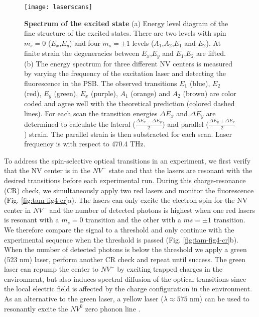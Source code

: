 \begin{figure*}
	\centering
	\texttt{[image: laserscans]}
	\caption{\label{fig:tam-fig4-laserscan} \textbf{Spectrum of the excited state} (a) Energy level diagram of the fine structure of the excited states. There are two levels with spin $m_s = 0$ ($E_x$,$E_y$) and four $m_s = \pm 1$ levels ($A_1$,$A_2$,$E_1$ and $E_2$). At finite strain the degeneracies between $E_x$,$E_y$ and $E_1$,$E_2$ are lifted. (b) The energy spectrum for three different NV centers is measured by varying the frequency of the excitation laser and detecting the fluorescence in the PSB. The observed transitions $E_1$ (blue), $E_2$ (red), $E_y$ (green), $E_x$ (purple), $A_1$ (orange) and $A_2$ (brown) are color coded and agree well with the theoretical prediction (colored dashed lines). For each scan the transition energies $\Delta E_x$ and $\Delta E_y$ are determined to calculate the lateral ($\frac{\Delta E_x-\Delta E_y}{2}$) and parallel ($\frac{\Delta E_y+\Delta E_x}{2}$) strain. The parallel strain is then substracted for each scan. Laser frequency is with respect to 470.4 THz.}
\end{figure*}

To address the spin-selective optical transitions in an experiment, we first verify that the NV center is in the $NV^-$ state and that the lasers are resonant with the desired transitions before each experimental run. During this charge-resonance (CR) check, we simultaneously apply two red lasers and monitor the fluorescence (Fig. \ref{fig:tam-fig4-cr}a). The lasers can only excite the electron spin for the NV center in $NV^-$ and the number of detected photons is highest when one red lasers is resonant with a $m_s = 0$ transition and the other with a $ms=\pm1$ transition. We therefore compare the signal to a threshold and only continue with the experimental sequence when the threshold is passed (Fig. \ref{fig:tam-fig4-cr}b). When the number of detected photons is below the threshold we apply a green (523 nm) laser, perform another CR check and repeat until success. The green laser can repump the center to $NV^-$ by exciting trapped charges in the environment, but also induces spectral diffusion of the optical transitions since the local electric field is affected by the charge configuration in the environment. As an alternative to the green laser, a yellow laser ($\lambda \approx 575$ nm) can be used to resonantly excite the $NV^0$ zero phonon line \cite{Siyushev_Phys.Rev.Lett._2013}. 

